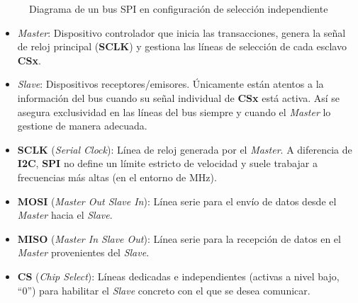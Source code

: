 \documentclass[../main.tex]{subfiles}
\begin{document}
\begin{figure}[hb]
{%
            }
            \caption{Diagrama de un bus SPI en configuración de selección independiente}
            \label{fig:spi_bus}
        \end{figure}

        \begin{itemize}
            \item \emph{Master}: Dispositivo controlador que inicia las transacciones, genera la señal de reloj principal (\textbf{SCLK}) y gestiona las líneas de selección de cada esclavo \textbf{CSx}.
            \item \emph{Slave}: Dispositivos receptores/emisores. Únicamente están atentos a la información del bus cuando su señal individual de \textbf{CSx} está activa. Así se asegura exclusividad en las líneas del bus siempre y cuando el \emph{Master} lo gestione de manera adecuada.
            \item \textbf{SCLK} (\emph{Serial Clock}): Línea de reloj generada por el \emph{Master}. A diferencia de \textbf{I2C}, \textbf{SPI} no define un límite estricto de velocidad y suele trabajar a frecuencias más altas (en el entorno de MHz).
            \item \textbf{MOSI} (\emph{Master Out Slave In}): Línea serie para el envío de datos desde el \emph{Master} hacia el \emph{Slave}.
            \item \textbf{MISO} (\emph{Master In Slave Out}): Línea serie para la recepción de datos en el \emph{Master} provenientes del \emph{Slave}.
            \item \textbf{CS} (\emph{Chip Select}): Líneas dedicadas e independientes (activas a nivel bajo, ``0'') para habilitar el \emph{Slave} concreto con el que se desea comunicar.
        \end{itemize}
\end{document}
